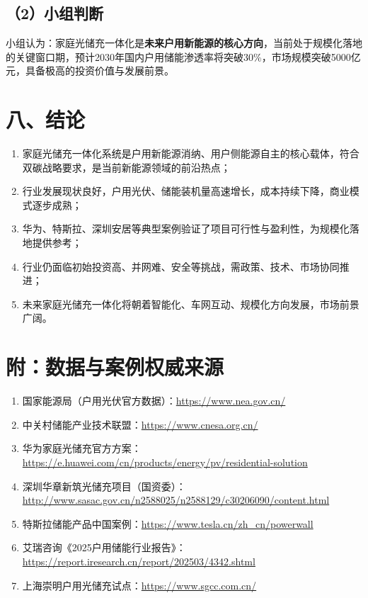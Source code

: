 \documentclass[12pt,a4paper,UTF8]{ctexart}
\begin{document}
\subsection*{（2）小组判断}
小组认为：家庭光储充一体化是\textbf{未来户用新能源的核心方向}，当前处于规模化落地的关键窗口期，预计2030年国内户用储能渗透率将突破30\%，市场规模突破5000亿元，具备极高的投资价值与发展前景。

\section*{八、结论}
\begin{enumerate}
    \item 家庭光储充一体化系统是户用新能源消纳、用户侧能源自主的核心载体，符合双碳战略要求，是当前新能源领域的前沿热点；
    \item 行业发展现状良好，户用光伏、储能装机量高速增长，成本持续下降，商业模式逐步成熟；
    \item 华为、特斯拉、深圳安居等典型案例验证了项目可行性与盈利性，为规模化落地提供参考；
    \item 行业仍面临初始投资高、并网难、安全等挑战，需政策、技术、市场协同推进；
    \item 未来家庭光储充一体化将朝着智能化、车网互动、规模化方向发展，市场前景广阔。
\end{enumerate}

\section*{附：数据与案例权威来源}
\begin{enumerate}
    \item 国家能源局（户用光伏官方数据）：\url{https://www.nea.gov.cn/}
    \item 中关村储能产业技术联盟：\url{https://www.cnesa.org.cn/}
    \item 华为家庭光储充官方方案：\url{https://e.huawei.com/cn/products/energy/pv/residential-solution}
    \item 深圳华章新筑光储充项目（国资委）：\url{http://www.sasac.gov.cn/n2588025/n2588129/c30206090/content.html}
    \item 特斯拉储能产品中国案例：\url{https://www.tesla.cn/zh_cn/powerwall}
    \item 艾瑞咨询《2025户用储能行业报告》：\url{https://report.iresearch.cn/report/202503/4342.shtml}
    \item 上海崇明户用光储充试点：\url{https://www.sgcc.com.cn/}
\end{enumerate}
\end{document}

